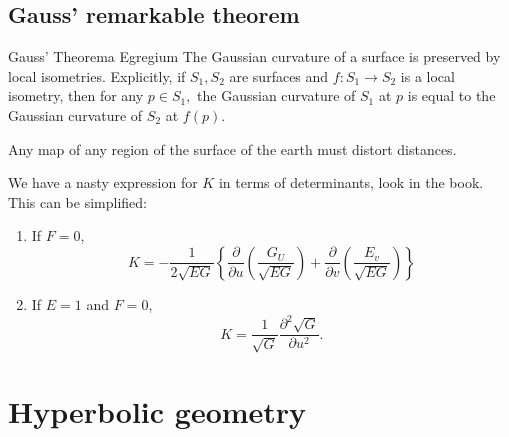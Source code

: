 \subsection{Gauss' remarkable theorem}
\begin{namedthm}{Gauss' Theorema Egregium} 
    The Gaussian curvature of a surface is preserved by local isometries. Explicitly, if $S_1 ,S_2$ are surfaces and $f \colon S_1 \to S_2$ is a local isometry, then for any $p \in S_1,$ the Gaussian curvature of $S_1$ at $p$ is equal to the Gaussian curvature of $S_2$ at $f(p)$.
\end{namedthm}
\begin{cor}
    Any map of any region of the surface of the earth must distort distances.
\end{cor}
    We have a nasty expression for $K$ in terms of determinants, look in the book. This can be simplified:
\begin{cor}
    \begin{enumerate}[label=(\roman*)]
    \setlength\itemsep{-.2em}
        \item If $F=0$, \[
                K= -\frac{1}{2 \sqrt{EG} }\left\{ \frac{\partial }{\partial u}\left( \frac{G_U}{\sqrt{EG} } \right) + \frac{\partial }{\partial v}\left( \frac{E_v}{\sqrt{EG} } \right)  \right\} 
        \] 
    \item If $E=1$ and $F=0$, \[
    K= \frac{1}{\sqrt{G} }\frac{\partial ^2 \sqrt{G} }{\partial u ^2}.
    \] 
    \end{enumerate}
\end{cor}


\section{Hyperbolic geometry} 

